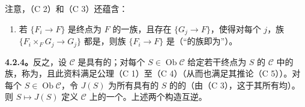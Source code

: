 注意，（C 2）和（C 3）还蕴含：
\begin{enumerate}
\item[（C 5）] 若 $\{F_i\to F\}$ 是终点为 $F$ 的一族，且存在 $\{G_j\to F\}$，使得对每个 $j$，族 $\{F_i\times_F G_j\to G_j\}$ 都是，则族 $\{F_i\to F\}$ 是（“的族即为”）。
\end{enumerate}
\textbf{4.2.4。}反之，设 $\mathcal C$ 是具有的；对每个 $S\in\operatorname{Ob}\mathcal C$ 给定若干终点为 $S$ 的 $\mathcal C$ 中的族，称为，且此资料满足公理（C 1）至（C 4）（从而也满足其推论（C 5））。对每个 $S\in\operatorname{Ob}\mathcal C$，令 $J(S)$ 为所有具有的 $S$ 的的（由（C 3），这于其所有均）。则 $S\mapsto J(S)$ 定义 $\mathcal C$ 上的一个。上述两个构造互逆。

